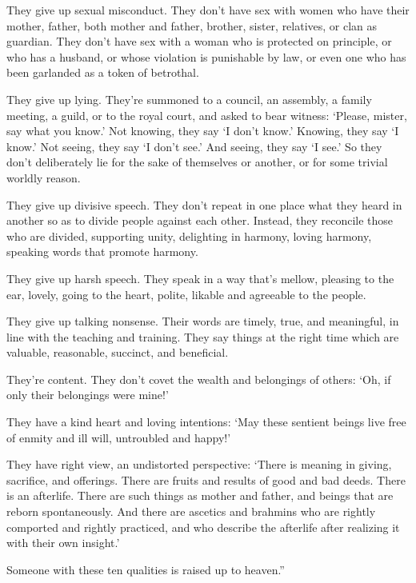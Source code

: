 \documentclass[12pt,openany]{book}%
\begin{document}
They give up sexual misconduct. They don’t have sex with women who have their mother, father, both mother and father, brother, sister, relatives, or clan as guardian. They don’t have sex with a woman who is protected on principle, or who has a husband, or whose violation is punishable by law, or even one who has been garlanded as a token of betrothal. 

They give up lying. They’re summoned to a council, an assembly, a family meeting, a guild, or to the royal court, and asked to bear witness: ‘Please, mister, say what you know.’ Not knowing, they say ‘I don’t know.’ Knowing, they say ‘I know.’ Not seeing, they say ‘I don’t see.’ And seeing, they say ‘I see.’ So they don’t deliberately lie for the sake of themselves or another, or for some trivial worldly reason. 

They give up divisive speech. They don’t repeat in one place what they heard in another so as to divide people against each other. Instead, they reconcile those who are divided, supporting unity, delighting in harmony, loving harmony, speaking words that promote harmony. 

They give up harsh speech. They speak in a way that’s mellow, pleasing to the ear, lovely, going to the heart, polite, likable and agreeable to the people. 

They give up talking nonsense. Their words are timely, true, and meaningful, in line with the teaching and training. They say things at the right time which are valuable, reasonable, succinct, and beneficial. 

They’re content. They don’t covet the wealth and belongings of others: ‘Oh, if only their belongings were mine!’ 

They have a kind heart and loving intentions: ‘May these sentient beings live free of enmity and ill will, untroubled and happy!’ 

They have right view, an undistorted perspective: ‘There is meaning in giving, sacrifice, and offerings. There are fruits and results of good and bad deeds. There is an afterlife. There are such things as mother and father, and beings that are reborn spontaneously. And there are ascetics and brahmins who are rightly comported and rightly practiced, and who describe the afterlife after realizing it with their own insight.’ 

Someone with these ten qualities is raised up to heaven.” 
\end{document}
